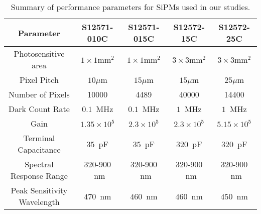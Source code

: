 \begin{table}[!ht]
\begin{center}
\caption{Summary of performance parameters for SiPMs used in our studies.}
\label{tab:SiPMParameters}
\begin{tabular}{|c|c|c|c|c|}
\hline
Parameter & S12571-010C & S12571-015C & S12572-15C & S12572-25C\\
\hline
Photosensitive area              & $1\times1\mathrm{mm}^{2}$ & $1\times1\mathrm{mm}^{2}$ & $3\times3\mathrm{mm}^{2}$ & $3\times3\mathrm{mm}^{2}$\\
Pixel Pitch                            & $10\mu$m                             & $15\mu$m                             & $15\mu$m                              & $25\mu$m\\
Number of Pixels                 &  10000                                    &  4489                                      & 40000                                     & 14400                       \\
Dark Count Rate                  &  $0.1$~MHz                            &  $0.1$~MHz                            & $1$~MHz                                 & $1$~MHz                  \\
Gain                                    & $1.35\times10^{5}$                  & $2.3\times10^{5}$                & $2.3\times10^{5}$                 & $5.15\times10^{5}$  \\
Terminal Capacitance          & $35$~pF                                 & $35$~pF                                  & $320$~pF                                & $320$~pF                  \\
Spectral Response Range     & $320$-$900$~nm                  & $320$-$900$~nm                  & $320$-$900$~nm                   & $320$-$900$~nm     \\
Peak Sensitivity Wavelength & $470$~nm                              & $460$~nm                              & $460$~nm                               & $450$~nm               \\         
\hline
\end{tabular}
\end{center}
\end{table}